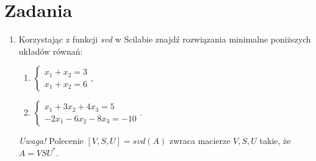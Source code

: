 \documentclass[12pt,a4paper]{article}
\theoremstyle{definition}
\begin{document}
	\section*{Zadania}
	\begin{enumerate}
		
		\item Korzystając z funkcji \emph{svd} w Scilabie znajd\'z rozwiązania minimalne poniższych układów równań:
		\begin{enumerate}
			\item $\begin{cases}
				x_1+x_2=3\\
				x_1+x_2=6
			\end{cases}$,
			\item $\begin{cases}
				x_1+3x_2+4x_3=5\\
				-2x_1-6x_2-8x_3=-10
			\end{cases}$.	
		\end{enumerate}
	\emph{Uwaga!} Polecenie $[V,S,U]=svd(A)$ zwraca macierze $V,S,U$ takie, że $A=VSU^{*}$.
		

\end{enumerate}
\end{document}
